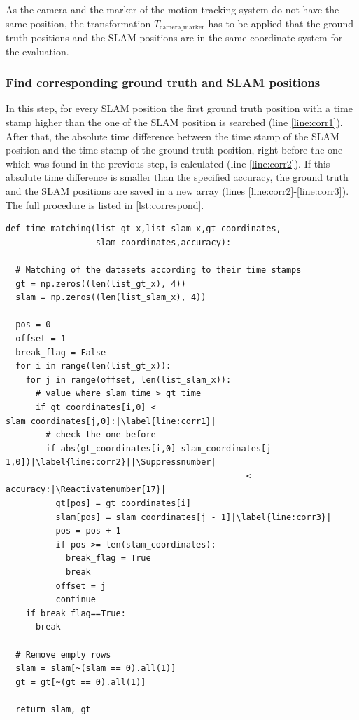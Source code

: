 As the camera and the marker of the motion tracking system do not have the same position, the transformation $T_{\text{camera\_marker}}$ has to be applied that the ground truth positions and the \ac{SLAM} positions are in the same coordinate system for the evaluation.

\subsubsection{Find corresponding ground truth and \ac{SLAM} positions}
In this step, for every \ac{SLAM} position the first ground truth position with a time stamp higher than the one of the \ac{SLAM} position is searched (line \autoref{line:corr1}). After that, the absolute time difference between the time stamp of the \ac{SLAM} position and the time stamp of the ground truth position, right before the one which was found in the previous step, is calculated (line \autoref{line:corr2}). If this absolute time difference is smaller than the specified accuracy, the ground truth and the \ac{SLAM} positions are saved in a new array (lines \autoref{line:corr2}-\autoref{line:corr3}). The full procedure is listed in \autoref{lst:correspond}.

\lstset{language=Python}
\begin{lstlisting}[frame=single, caption=Find corresponding positions in time, label=lst:correspond]
def time_matching(list_gt_x,list_slam_x,gt_coordinates,
                  slam_coordinates,accuracy):

  # Matching of the datasets according to their time stamps
  gt = np.zeros((len(list_gt_x), 4))
  slam = np.zeros((len(list_slam_x), 4))

  pos = 0
  offset = 1
  break_flag = False
  for i in range(len(list_gt_x)):
    for j in range(offset, len(list_slam_x)):
      # value where slam time > gt time
      if gt_coordinates[i,0] < slam_coordinates[j,0]:|\label{line:corr1}|
        # check the one before
        if abs(gt_coordinates[i,0]-slam_coordinates[j-1,0])|\label{line:corr2}||\Suppressnumber|
                                                < accuracy:|\Reactivatenumber{17}|
          gt[pos] = gt_coordinates[i]
          slam[pos] = slam_coordinates[j - 1]|\label{line:corr3}|
          pos = pos + 1
          if pos >= len(slam_coordinates):
            break_flag = True
            break
          offset = j
          continue
    if break_flag==True:
      break

  # Remove empty rows
  slam = slam[~(slam == 0).all(1)]
  gt = gt[~(gt == 0).all(1)]

  return slam, gt
\end{lstlisting}

